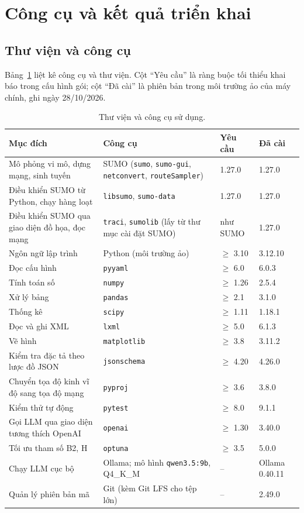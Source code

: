 \documentclass[../DoAn.tex]{subfiles}
\begin{document}
\section{Công cụ và kết quả triển khai}
\label{section:tools}

\subsection{Thư viện và công cụ}

Bảng~\ref{table:4.3} liệt kê công cụ và thư viện. Cột ``Yêu cầu'' là ràng buộc tối thiểu khai báo trong cấu hình gói; cột ``Đã cài'' là phiên bản trong môi trường ảo của máy chính, ghi ngày 28/10/2026.

\begin{table}[H]
\centering
\small
\caption{Thư viện và công cụ sử dụng.}
\label{table:4.3}
\begin{tabular}{|p{4.6cm}|p{4.4cm}|p{2.0cm}|p{2.0cm}|}
\hline
\textbf{Mục đích} & \textbf{Công cụ} & \textbf{Yêu cầu} & \textbf{Đã cài} \\ \hline
Mô phỏng vi mô, dựng mạng, sinh tuyến & SUMO (\texttt{sumo}, \texttt{sumo-gui}, \texttt{netconvert}, \texttt{routeSampler})~\cite{lopez2018sumo} & 1.27.0 & 1.27.0 \\ \hline
Điều khiển SUMO từ Python, chạy hàng loạt & \texttt{libsumo}, \texttt{sumo-data} & 1.27.0 & 1.27.0 \\ \hline
Điều khiển SUMO qua giao diện đồ họa, đọc mạng & \texttt{traci}, \texttt{sumolib} (lấy từ thư mục cài đặt SUMO) & như SUMO & 1.27.0 \\ \hline
Ngôn ngữ lập trình & Python (môi trường ảo) & $\geq$ 3.10 & 3.12.10 \\ \hline
Đọc cấu hình & \texttt{pyyaml} & $\geq$ 6.0 & 6.0.3 \\ \hline
Tính toán số & \texttt{numpy} & $\geq$ 1.26 & 2.5.4 \\ \hline
Xử lý bảng & \texttt{pandas} & $\geq$ 2.1 & 3.1.0 \\ \hline
Thống kê & \texttt{scipy} & $\geq$ 1.11 & 1.18.1 \\ \hline
Đọc và ghi XML & \texttt{lxml} & $\geq$ 5.0 & 6.1.3 \\ \hline
Vẽ hình & \texttt{matplotlib} & $\geq$ 3.8 & 3.11.2 \\ \hline
Kiểm tra đặc tả theo lược đồ JSON & \texttt{jsonschema} & $\geq$ 4.20 & 4.26.0 \\ \hline
Chuyển tọa độ kinh vĩ độ sang tọa độ mạng & \texttt{pyproj} & $\geq$ 3.6 & 3.8.0 \\ \hline
Kiểm thử tự động & \texttt{pytest} & $\geq$ 8.0 & 9.1.1 \\ \hline
Gọi LLM qua giao diện tương thích OpenAI & \texttt{openai} & $\geq$ 1.30 & 3.40.0 \\ \hline
Tối ưu tham số B2, H~\cite{akiba2019optuna} & \texttt{optuna} & $\geq$ 3.5 & 5.0.0 \\ \hline
Chạy LLM cục bộ & Ollama; mô hình \texttt{qwen3.5:9b}, Q4\_K\_M & -- & Ollama 0.40.11 \\ \hline
Quản lý phiên bản mã & Git (kèm Git LFS cho tệp lớn) & -- & 2.49.0 \\ \hline
\end{tabular}
\end{table}
\end{document}
